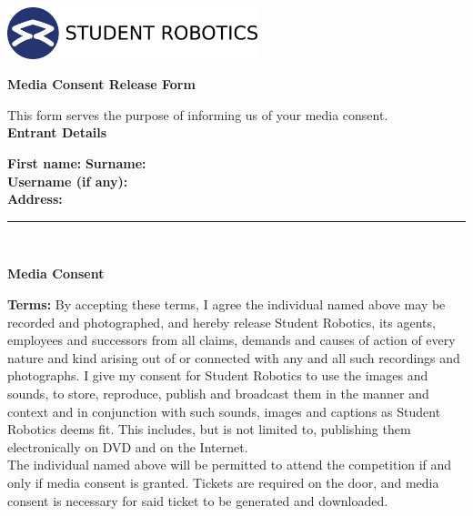 \documentclass[a4paper,10pt]{article}
\newcommand{\textfield}[1]{\textbf{#1:} \hrulefill\hspace{0mm}}
\newcommand{\fieldsep}{\\[2.5mm]}
\newcommand{\textfieldline}{{\hrule\hspace{2mm}\fieldsep}}
\begin{document}
\pagestyle{empty}

\begin{minipage}[c]{0.38\textwidth}
\includegraphics[height=1.5cm]{logo}
\end{minipage}
\hspace{0.12\textwidth}
\begin{minipage}[c]{0.48\textwidth}
\begin{center}
{\LARGE \textbf{Media Consent Release Form} \par}
\end{center}
\end{minipage}
\vspace{1cm}

This form serves the purpose of informing us of your media consent.\\

\textbf{\large Entrant Details}\\\vspace{-2mm}

\textfield{First name}  \textfield{Surname} \fieldsep
\textfield{Username (if any)} \fieldsep
\textfield{Address} \fieldsep
\textfieldline


\textbf{\large Media Consent}\\\vspace{-3mm}

\textbf{Terms:} By accepting these terms, I agree the individual named above may be recorded and photographed, and hereby release Student Robotics, its agents, employees and successors from all claims, demands and causes of action of every nature and kind arising out of or connected with any and all such recordings and photographs.
I give my consent for Student Robotics to use the images and sounds, to store, reproduce, publish and broadcast them in the manner and context and in conjunction with such sounds, images and captions as Student Robotics deems fit.
This includes, but is not limited to, publishing them electronically on DVD and on the Internet.\\

The individual named above will be permitted to attend the competition if and only if media consent is granted.
Tickets are required on the door, and media consent is necessary for said ticket to be generated and downloaded.\\
\end{document}
